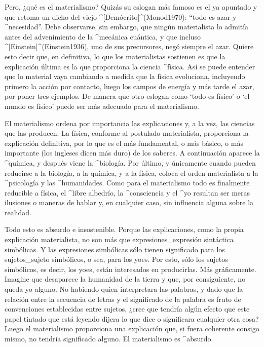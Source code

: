 Pero, ¿qué es el materialismo? Quizás su eslogan más famoso es el ya
apuntado y que retoma un dicho del viejo ^[Demócrito]^(Monod1970):
``todo es azar y ^{necesidad}''. Debe observarse, sin embargo, que
ningún materialista lo admitía antes del advenimiento de la ^{mecánica
cuántica}, y que incluso ^[Einstein]^(Einstein1936), uno de sus
precursores, negó siempre el azar. Quiere esto decir que, en definitiva,
lo que los materialistas sostienen es que la explicación última es la
que proporciona la ciencia ^{física}. Así se puede entender que lo
material vaya cambiando a medida que la física evoluciona, incluyendo
primero la acción por contacto, luego los campos de energía y más tarde
el azar, por poner tres ejemplos. De manera que otro eslogan como `todo
es físico' o `el mundo es físico' puede ser más adecuado para el
materialismo.

El materialismo ordena por importancia las explicaciones y, a la vez,
las ciencias que las producen. La física, conforme al postulado
materialista, proporciona la explicación definitiva, por lo que es el
más fundamental, o más básico, o más importante (los ingleses dicen más
duro) de los saberes. A continuación aparece la ^{química}, y después
viene la ^{biología}. Por último, y únicamente cuando pueden reducirse a
la biología, a la química, y a la física, coloca el orden materialista a
la ^{psicología} y las ^{humanidades}. Como para el materialismo todo es
finalmente reducible a física, el ^{libre albedrío}, la ^{consciencia} y
el ^{yo} resultan ser meras ilusiones o maneras de hablar y, en
cualquier caso, sin influencia alguna sobre la realidad.

Todo esto es absurdo e insostenible. Porque las explicaciones, como la
propia explicación materialista, no son más que expresiones_{expresión
sintáctica} simbólicas. Y las expresiones simbólicas sólo tienen
significado para los sujetos_{sujeto} simbólicos, o sea, para los yoes.
Por esto, sólo los sujetos simbólicos, es decir, los yoes, están
interesados en producirlas. Más gráficamente. Imagine que desaparece la
humanidad de la tierra y que, por consiguiente, no queda yo alguno. No
habiendo quien interpretara las palabras, y dado que la relación entre
la secuencia de letras y el significado de la palabra es fruto de
convenciones establecidas entre sujetos, ¿cree que tendría algún efecto
que este papel tintado que está leyendo dijera lo que dice o significara
cualquier otra cosa? Luego el materialismo proporciona una explicación
que, si fuera coherente consigo mismo, no tendría significado alguno. El
materialismo es ^{absurdo}.

